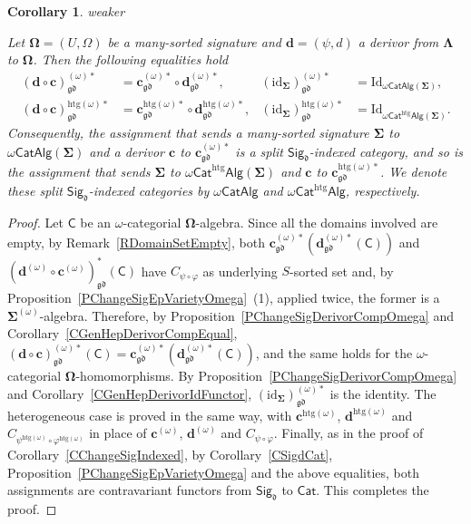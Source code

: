 \documentclass[a4paper, reqno]{amsbook}
\makeatletter
\newcommand{\sig}[1]{\mathbf{#1}}             %
\newcommand{\calg}[1]{\boldsymbol{\mathsf{#1}}} %
\newcommand{\gd}{\mathfrak{gd}}              %
\newcommand{\htg}{\mathrm{htg}}                %
\newcommand{\id}{\mathrm{id}}
\newcommand{\Id}{\mathrm{Id}}
\theoremstyle{plain}
\newtheorem{corollary}[theorem]{Corollary}
\theoremstyle{definition}
\newcommand*{\CA@leanpending}{}
\newcommand*{\CA@leanrelation}{}
\newcommand*{\lean}[2]{%
  \ifcsname\string\color@lean@#1\endcsname\else
    \PackageError{main}{Unknown relation `#1' in \string\lean}{Use equivalent, weaker or stronger.}%
  \fi
  \gdef\CA@leanrelation{#1}%
  \gdef\CA@leanpending{#2}}
\makeatother
\begin{document}
\begin{corollary}\label{CChangeSigIndexedOmega}\lean{weaker}{ChangeOfSignature.homogeneousOmegaFunctorComp,ChangeOfSignature.homogeneousOmegaFunctorIdentity,ChangeOfSignature.homogeneousOmegaIndexed,ChangeOfSignature.heterogeneousIndexed}
Let $\sig{\Omega}=(U,\Omega)$ be a many-sorted signature and $\mathbf{d}=(\psi,d)$ a derivor from $\sig{\Lambda}$ to $\sig{\Omega}$.
Then the following equalities hold
\begin{align*}
(\mathbf{d}\circ\mathbf{c})^{(\omega)\ast}_{\gd}&=\mathbf{c}^{(\omega)\ast}_{\gd}\circ\mathbf{d}^{(\omega)\ast}_{\gd},
&
(\id_{\sig{\Sigma}})^{(\omega)\ast}_{\gd}&=\Id_{\omega\mathsf{CatAlg}(\sig{\Sigma})},
\\
(\mathbf{d}\circ\mathbf{c})^{\htg(\omega)\ast}_{\gd}&=\mathbf{c}^{\htg(\omega)\ast}_{\gd}\circ\mathbf{d}^{\htg(\omega)\ast}_{\gd},
&
(\id_{\sig{\Sigma}})^{\htg(\omega)\ast}_{\gd}&=\Id_{\omega\mathsf{Cat}^{\htg}\mathsf{Alg}(\sig{\Sigma})}.
\end{align*}
Consequently, the assignment that sends a many-sorted signature $\sig{\Sigma}$ to $\omega\mathsf{CatAlg}(\sig{\Sigma})$ and a derivor $\mathbf{c}$ to $\mathbf{c}^{(\omega)\ast}_{\gd}$ is a split $\mathsf{Sig}_{\mathfrak{d}}$-indexed category, and so is the assignment that sends $\sig{\Sigma}$ to $\omega\mathsf{Cat}^{\htg}\mathsf{Alg}(\sig{\Sigma})$ and $\mathbf{c}$ to $\mathbf{c}^{\htg(\omega)\ast}_{\gd}$.
We denote these split $\mathsf{Sig}_{\mathfrak{d}}$-indexed categories by $\omega\mathsf{CatAlg}$ and $\omega\mathsf{Cat}^{\htg}\mathsf{Alg}$, respectively.
\end{corollary}
\begin{proof}
Let $\calg{C}$ be an $\omega$-categorial $\sig{\Omega}$-algebra.
Since all the domains involved are empty, by Remark~\ref{RDomainSetEmpty}, both $\mathbf{c}^{(\omega)\ast}_{\gd}(\mathbf{d}^{(\omega)\ast}_{\gd}(\calg{C}))$ and $(\mathbf{d}^{(\omega)}\circ\mathbf{c}^{(\omega)})^{\ast}_{\gd}(\calg{C})$ have $C_{\psi\circ\varphi}$ as underlying $S$-sorted set and, by Proposition~\ref{PChangeSigEpVarietyOmega}~(1), applied twice, the former is a $\sig{\Sigma}^{(\omega)}$-algebra.
Therefore, by Proposition~\ref{PChangeSigDerivorCompOmega} and Corollary~\ref{CGenHepDerivorCompEqual}, $(\mathbf{d}\circ\mathbf{c})^{(\omega)\ast}_{\gd}(\calg{C})=\mathbf{c}^{(\omega)\ast}_{\gd}(\mathbf{d}^{(\omega)\ast}_{\gd}(\calg{C}))$, and the same holds for the $\omega$-categorial $\sig{\Omega}$-homomorphisms.
By Proposition~\ref{PChangeSigDerivorCompOmega} and Corollary~\ref{CGenHepDerivorIdFunctor}, $(\id_{\sig{\Sigma}})^{(\omega)\ast}_{\gd}$ is the identity.
The heterogeneous case is proved in the same way, with $\mathbf{c}^{\htg(\omega)}$, $\mathbf{d}^{\htg(\omega)}$ and $C_{\psi^{\htg(\omega)}\circ\varphi^{\htg(\omega)}}$ in place of $\mathbf{c}^{(\omega)}$, $\mathbf{d}^{(\omega)}$ and $C_{\psi\circ\varphi}$.
Finally, as in the proof of Corollary~\ref{CChangeSigIndexed}, by Corollary~\ref{CSigdCat}, Proposition~\ref{PChangeSigEpVarietyOmega} and the above equalities, both assignments are contravariant functors from $\mathsf{Sig}_{\mathfrak{d}}$ to $\mathsf{Cat}$. This completes the proof.
\end{proof}
\end{document}
